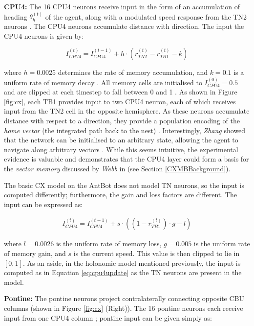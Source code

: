 \documentclass[a4paper,11pt,twoside,openright]{article}
\begin{document}
\textbf{CPU4:}
The 16 CPU4 neurons receive input in the form of an accumulation of
heading $\theta_h^{(t)}$ of the agent, along with a modulated speed response
from the TN2 neurons \cite{Stone2017}. The CPU4 neurons accumulate distance with
direction. The input the CPU4 neurons is given by:

\begin{equation}
  \label{eq:cpu4update}
I_{CPU4}^{(t)} = I_{CPU4}^{(t - 1)} + h \cdot (r_{TN2}^{(t)} - r_{TB1}^{(t)} - k)
\end{equation}

where $h = 0.0025$ determines the rate of memory accumulation, and $k = 0.1$ is
a uniform rate of memory decay \cite{Stone2017}. All memory cells are initialised
to $I_{CPU4}^{(0)} = 0.5$ and are clipped at each timestep to fall between 0 and
1 \cite{Stone2017}. As shown in Figure \ref{fig:cx}, each TB1 provides input to
two CPU4 neuron, each of which receives input from the TN2 cell in the opposite
hemisphere. As these neurons accumulate distance with respect to a direction,
they provide a population encoding of the \textit{home vector} (the integrated
path back to the nest) \cite{Stone2017}. Interestingly, \textit{Zhang} showed
that the network can be initialised to an arbitrary state, allowing the agent
to navigate along arbitrary vectors \cite{Zhang2017}. While this seems intuitive,
the experimental evidence is valuable and demonstrates that the CPU4 layer could
form a basis for the \textit{vector memory} discussed by \textit{Webb} in
\cite{Webb2018} (see Section \ref{CXMBBackground}).
\newline
\par

The basic CX model on the AntBot does not model TN neurons, so the input is
computed differently; furthermore, the gain and loss factors are different.
The input can be expressed as:

\begin{align}
  I_{CPU4}^{(t)} =
  I_{CPU4}^{(t - 1)} + s \cdot ((1 - r_{TB1}^{(t)}) \cdot g - l)
\end{align}

where $l = 0.0026$ is the uniform rate of memory loss, $g = 0.005$ is the
uniform rate of memory gain, and $s$ is the current speed. This value is
then clipped to lie in $[0,1]$. As an aside, in the holonomic model
mentioned previously, the input is computed as in Equation \ref{eq:cpu4update}
as the TN neurons are present in the model.

\textbf{Pontine:}
The pontine neurons project contralaterally connecting opposite CBU columns
(shown in Figure \ref{fig:cx} (Right)). The 16 pontine neurons each receive input
from one CPU4 column \cite{Stone2017}; pontine input can be given simply as:
\newline
\par
\end{document}
